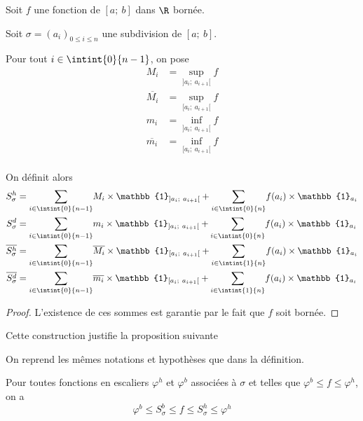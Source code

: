 \begin{de}
Soit $f$ une fonction de $[a;~b]$ dans $\R$ bornée.

Soit $\sigma = (a_i)_{0 \leq i \leq n}$ une subdivision de $[a;~b]$.

Pour tout $i \in \intint{0}{n-1}$, on pose 
\begin{align*}
M_i & = \sup \limits_{]a_i;~a_{i+1}[} f\\
\overline{M_i} & = \sup \limits_{[a_i;~a_{i+1}[} f\\
m_i & = \inf \limits_{]a_i;~a_{i+1}[} f\\
\overline{m_i} & = \inf \limits_{[a_i;~a_{i+1}[} f\\
\end{align*}

On définit alors 
\begin{align*}
S_\sigma^h & = \displaystyle{\sum \limits_{i \in \intint{0}{n-1}}} M_i \times \mathbb{1}_{]a_i;~a_{i+1}[} +  \displaystyle{\sum \limits_{i \in \intint{0}{n}}} f(a_i) \times \mathbb{1}_{a_i} \\
S_\sigma^d & = \displaystyle{\sum \limits_{i \in \intint{0}{n-1}}} m_i \times \mathbb{1}_{]a_i;~a_{i+1}[} +  \displaystyle{\sum \limits_{i \in \intint{0}{n}}} f(a_i) \times \mathbb{1}_{a_i} \\
\overline{S_\sigma^h} & = \displaystyle{\sum \limits_{i \in \intint{0}{n-1}}} \overline{M_i} \times \mathbb{1}_{[a_i;~a_{i+1}[} +  \displaystyle{\sum \limits_{i \in \intint{1}{n}}} f(a_i) \times \mathbb{1}_{a_i} \\
\overline{S_\sigma^d} & = \displaystyle{\sum \limits_{i \in \intint{0}{n-1}}} \overline{m_i} \times \mathbb{1}_{[a_i;~a_{i+1}[} +  \displaystyle{\sum \limits_{i \in \intint{1}{n}}} f(a_i) \times \mathbb{1}_{a_i} 
\end{align*}

\end{de}

\begin{proof}
L'existence de ces sommes est garantie par le fait que $f$ soit bornée.
\end{proof}

Cette construction justifie la proposition suivante

\begin{prop}
On reprend les mêmes notations et hypothèses que dans la définition.

Pour toutes fonctions en escaliers $\varphi^h$ et $\varphi^b$ associées à $\sigma$ et telles que $\varphi^b \leq f \leq \varphi^h$, on a
\[
\varphi^b \leq S_\sigma^b  \leq f \leq S_\sigma^h \leq \varphi^h
\]
\end{prop}


